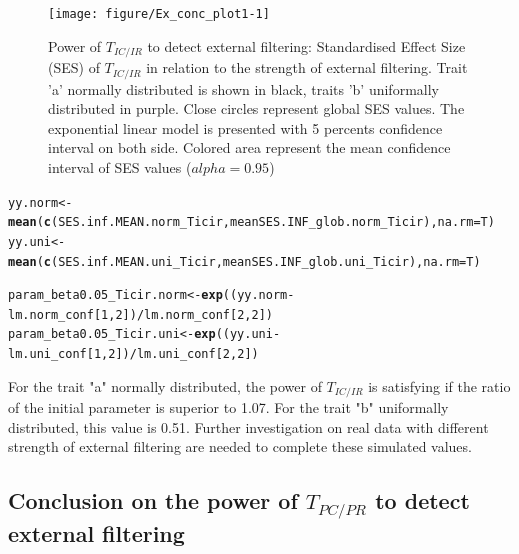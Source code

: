 \documentclass[12pt]{article}\usepackage[]{graphicx}\usepackage[]{color}
\makeatletter
\newcommand{\hlnum}[1]{\textcolor[rgb]{0.686,0.059,0.569}{#1}}%
\newcommand{\hlopt}[1]{\textcolor[rgb]{0,0,0}{#1}}%
\newcommand{\hlstd}[1]{\textcolor[rgb]{0.345,0.345,0.345}{#1}}%
\newcommand{\hlkwb}[1]{\textcolor[rgb]{0.69,0.353,0.396}{#1}}%
\newcommand{\hlkwc}[1]{\textcolor[rgb]{0.333,0.667,0.333}{#1}}%
\newcommand{\hlkwd}[1]{\textcolor[rgb]{0.737,0.353,0.396}{\textbf{#1}}}%
\newenvironment{kframe}{%
 \def\at@end@of@kframe{}%
 \ifinner\ifhmode%
  \def\at@end@of@kframe{\end{minipage}}%
  \begin{minipage}{\columnwidth}%
 \fi\fi%
 \def\FrameCommand##1{\hskip\@totalleftmargin \hskip-\fboxsep
 \colorbox{shadecolor}{##1}\hskip-\fboxsep
     \hskip-\linewidth \hskip-\@totalleftmargin \hskip\columnwidth}%
 \MakeFramed {\advance\hsize-\width
   \@totalleftmargin\z@ \linewidth\hsize
   \@setminipage}}%
 {\par\unskip\endMakeFramed%
 \at@end@of@kframe}
\newenvironment{knitrout}{}{} %
\makeatother
\begin{document}
\begin{knitrout}
\begin{figure}
{\centering \texttt{[image: figure/Ex\_conc\_plot1-1]} 

}

\caption[Power of $T_{IC/IR}$ to detect external filtering]{Power of $T_{IC/IR}$ to detect external filtering: Standardised Effect Size (SES) of $T_{IC/IR}$ in relation to the strength of external filtering. Trait 'a' normally distributed is shown in black, traits 'b' uniformally distributed in purple. Close circles represent global SES values. The exponential linear model is presented with 5 percents confidence interval on both side. Colored area represent the mean confidence interval of SES values ($alpha = 0.95$)\label{fig:Ex_conc_plot1}}
\end{figure}


\end{knitrout}

\begin{knitrout}\small
{}\color{fgcolor}\begin{kframe}
\begin{alltt}
\hlstd{yy.norm} \hlkwb{<-} \hlkwd{mean}\hlstd{(}\hlkwd{c}\hlstd{(SES.inf.MEAN.norm_Ticir, meanSES.INF_glob.norm_Ticir),} \hlkwc{na.rm} \hlstd{= T)}
\hlstd{yy.uni} \hlkwb{<-} \hlkwd{mean}\hlstd{(}\hlkwd{c}\hlstd{(SES.inf.MEAN.uni_Ticir, meanSES.INF_glob.uni_Ticir),} \hlkwc{na.rm} \hlstd{= T)}

\hlstd{param_beta0.05_Ticir.norm} \hlkwb{<-} \hlkwd{exp}\hlstd{( (yy.norm} \hlopt{-} \hlstd{lm.norm_conf [}\hlnum{1}\hlstd{,} \hlnum{2}\hlstd{])} \hlopt{/} \hlstd{lm.norm_conf [}\hlnum{2}\hlstd{,} \hlnum{2}\hlstd{] )}
\hlstd{param_beta0.05_Ticir.uni} \hlkwb{<-} \hlkwd{exp}\hlstd{( (yy.uni} \hlopt{-} \hlstd{lm.uni_conf [}\hlnum{1}\hlstd{,} \hlnum{2}\hlstd{])} \hlopt{/} \hlstd{lm.uni_conf [}\hlnum{2}\hlstd{,} \hlnum{2}\hlstd{] )}
\end{alltt}
\end{kframe}
\end{knitrout}


For the trait "a" normally distributed, the power of $T_{IC/IR}$ is satisfying if the ratio of the initial parameter is superior to
 1.07. For the trait "b" uniformally distributed, this value is 0.51. 
 Further investigation on real data with different strength of external filtering are needed to complete these simulated values.

 




  \subsection {Conclusion on the power of $T_{PC/PR}$ to detect external filtering}
\end{document}
